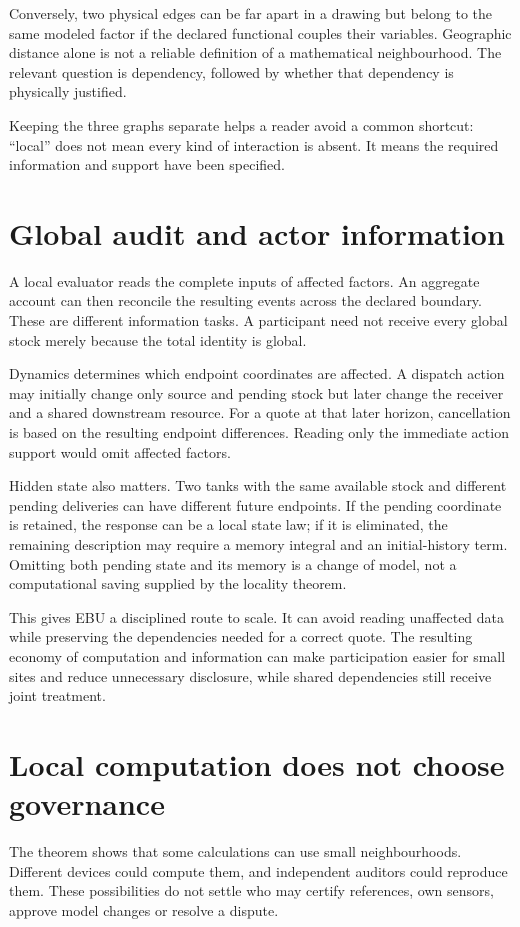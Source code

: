 Conversely, two physical edges can be far apart in a drawing but belong to the same modeled factor if the declared functional couples their variables. Geographic distance alone is not a reliable definition of a mathematical neighbourhood. The relevant question is dependency, followed by whether that dependency is physically justified.

Keeping the three graphs separate helps a reader avoid a common shortcut: ``local'' does not mean every kind of interaction is absent. It means the required information and support have been specified.

\section{Global audit and actor information}
A local evaluator reads the complete inputs of affected factors. An aggregate account can then reconcile the resulting events across the declared boundary. These are different information tasks. A participant need not receive every global stock merely because the total identity is global.

Dynamics determines which endpoint coordinates are affected. A dispatch action may initially change only source and pending stock but later change the receiver and a shared downstream resource. For a quote at that later horizon, cancellation is based on the resulting endpoint differences. Reading only the immediate action support would omit affected factors.

Hidden state also matters. Two tanks with the same available stock and different pending deliveries can have different future endpoints. If the pending coordinate is retained, the response can be a local state law; if it is eliminated, the remaining description may require a memory integral and an initial-history term. Omitting both pending state and its memory is a change of model, not a computational saving supplied by the locality theorem.

This gives EBU a disciplined route to scale. It can avoid reading unaffected data while preserving the dependencies needed for a correct quote. The resulting economy of computation and information can make participation easier for small sites and reduce unnecessary disclosure, while shared dependencies still receive joint treatment.

\section{Local computation does not choose governance}
The theorem shows that some calculations can use small neighbourhoods. Different devices could compute them, and independent auditors could reproduce them. These possibilities do not settle who may certify references, own sensors, approve model changes or resolve a dispute.


